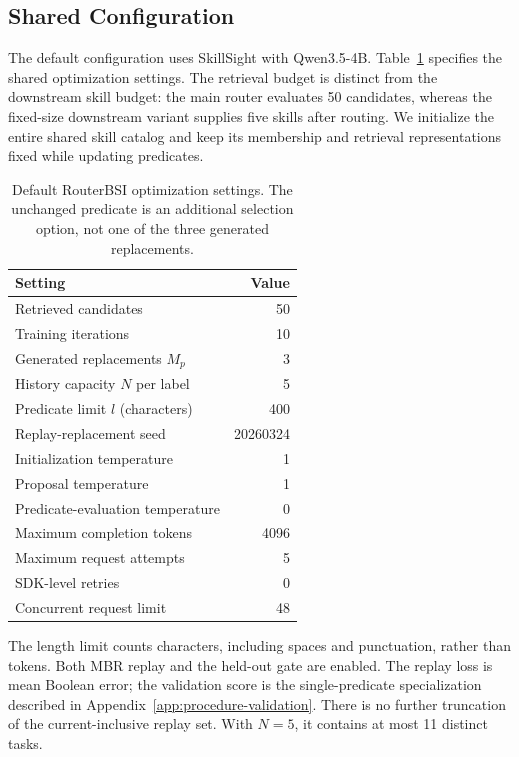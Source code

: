 \subsection{Shared Configuration}
\label{app:implementation-settings}
The default configuration uses SkillSight with Qwen3.5-4B. Table~\ref{tab:appendix-settings} specifies the shared optimization settings. The retrieval budget is distinct from the downstream skill budget: the main router evaluates 50 candidates, whereas the fixed-size downstream variant supplies five skills after routing. We initialize the entire shared skill catalog and keep its membership and retrieval representations fixed while updating predicates.

\begin{table}[t]
\centering\small
\begin{tabular}{lr}
\toprule
Setting & Value\\
\midrule
Retrieved candidates & 50\\
Training iterations & 10\\
Generated replacements $M_p$ & 3\\
History capacity $N$ per label & 5\\
Predicate limit $l$ (characters) & 400\\
Replay-replacement seed & 20260324\\
Initialization temperature & 1\\
Proposal temperature & 1\\
Predicate-evaluation temperature & 0\\
Maximum completion tokens & 4096\\
Maximum request attempts & 5\\
SDK-level retries & 0\\
Concurrent request limit & 48\\
\bottomrule
\end{tabular}
\caption{Default RouterBSI optimization settings. The unchanged predicate is an additional selection option, not one of the three generated replacements.}
\label{tab:appendix-settings}
\end{table}

The length limit counts characters, including spaces and punctuation, rather than tokens. Both MBR replay and the held-out gate are enabled. The replay loss is mean Boolean error; the validation score is the single-predicate specialization described in Appendix~\ref{app:procedure-validation}. There is no further truncation of the current-inclusive replay set. With $N=5$, it contains at most 11 distinct tasks.
